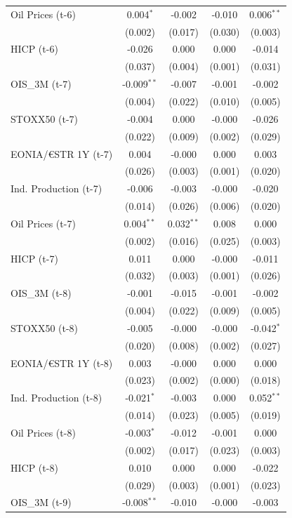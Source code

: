 \begin{longtable}[t]{lcccc}
Oil Prices (t-6) & 0.004$^{*}$ & -0.002 & -0.010 & 0.006$^{**}$\\
 & (0.002) & (0.017) & (0.030) & (0.003)\\
HICP (t-6) & -0.026 & 0.000 & 0.000 & -0.014\\
 & (0.037) & (0.004) & (0.001) & (0.031)\\
OIS\_3M (t-7) & -0.009$^{**}$ & -0.007 & -0.001 & -0.002\\
 & (0.004) & (0.022) & (0.010) & (0.005)\\
STOXX50 (t-7) & -0.004 & 0.000 & -0.000 & -0.026\\
 & (0.022) & (0.009) & (0.002) & (0.029)\\
EONIA/€STR 1Y (t-7) & 0.004 & -0.000 & 0.000 & 0.003\\
 & (0.026) & (0.003) & (0.001) & (0.020)\\
Ind. Production (t-7) & -0.006 & -0.003 & -0.000 & -0.020\\
 & (0.014) & (0.026) & (0.006) & (0.020)\\
Oil Prices (t-7) & 0.004$^{**}$ & 0.032$^{**}$ & 0.008 & 0.000\\
 & (0.002) & (0.016) & (0.025) & (0.003)\\
HICP (t-7) & 0.011 & 0.000 & -0.000 & -0.011\\
 & (0.032) & (0.003) & (0.001) & (0.026)\\
OIS\_3M (t-8) & -0.001 & -0.015 & -0.001 & -0.002\\
 & (0.004) & (0.022) & (0.009) & (0.005)\\
STOXX50 (t-8) & -0.005 & -0.000 & -0.000 & -0.042$^{*}$\\
 & (0.020) & (0.008) & (0.002) & (0.027)\\
EONIA/€STR 1Y (t-8) & 0.003 & -0.000 & 0.000 & 0.000\\
 & (0.023) & (0.002) & (0.000) & (0.018)\\
Ind. Production (t-8) & -0.021$^{*}$ & -0.003 & 0.000 & 0.052$^{**}$\\
 & (0.014) & (0.023) & (0.005) & (0.019)\\
Oil Prices (t-8) & -0.003$^{*}$ & -0.012 & -0.001 & 0.000\\
 & (0.002) & (0.017) & (0.023) & (0.003)\\
HICP (t-8) & 0.010 & 0.000 & 0.000 & -0.022\\
 & (0.029) & (0.003) & (0.001) & (0.023)\\
OIS\_3M (t-9) & -0.008$^{**}$ & -0.010 & -0.000 & -0.003\\

\end{longtable}
